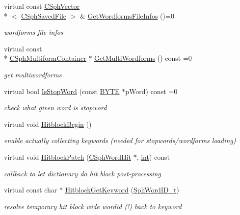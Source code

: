 \begin{DoxyCompactItemize}
virtual const \hyperlink{classCSphVector}{C\-Sph\-Vector}\\*
$<$ \hyperlink{structCSphSavedFile}{C\-Sph\-Saved\-File} $>$ \& \hyperlink{classCSphDict_accd7f795018b4f9f6b2b4c2e1115da13}{Get\-Wordforms\-File\-Infos} ()=0
\begin{DoxyCompactList}\small\item\em wordforms file infos \end{DoxyCompactList}\item 
virtual const \\*
\hyperlink{structCSphMultiformContainer}{C\-Sph\-Multiform\-Container} $\ast$ \hyperlink{classCSphDict_aa279b03d0a4b1a2ddc79c56887f48bcb}{Get\-Multi\-Wordforms} () const =0
\begin{DoxyCompactList}\small\item\em get multiwordforms \end{DoxyCompactList}\item 
virtual bool \hyperlink{classCSphDict_a5237fd1aa3eceb2fc3422d057af4986d}{Is\-Stop\-Word} (const \hyperlink{sphinxstd_8h_a4ae1dab0fb4b072a66584546209e7d58}{B\-Y\-T\-E} $\ast$p\-Word) const =0
\begin{DoxyCompactList}\small\item\em check what given word is stopword \end{DoxyCompactList}\item 
virtual void \hyperlink{classCSphDict_a51bb25ba9d3d4e38bb0136b894fce2c3}{Hitblock\-Begin} ()
\begin{DoxyCompactList}\small\item\em enable actually collecting keywords (needed for stopwords/wordforms loading) \end{DoxyCompactList}\item 
virtual void \hyperlink{classCSphDict_acc7efa292e426ed72b13eef361634c5f}{Hitblock\-Patch} (\hyperlink{structCSphWordHit}{C\-Sph\-Word\-Hit} $\ast$, \hyperlink{sphinxexpr_8cpp_a4a26e8f9cb8b736e0c4cbf4d16de985e}{int}) const 
\begin{DoxyCompactList}\small\item\em callback to let dictionary do hit block post-\/processing \end{DoxyCompactList}\item 
virtual const char $\ast$ \hyperlink{classCSphDict_ae89d2ea5d0d6882c25aa654f2ff3bc62}{Hitblock\-Get\-Keyword} (\hyperlink{sphinx_8h_a80a94d5984fdf9214a98f3e5e65df963}{Sph\-Word\-I\-D\-\_\-t})
\begin{DoxyCompactList}\small\item\em resolve temporary hit block wide wordid (!) back to keyword \end{DoxyCompactList}\item 

\end{DoxyCompactItemize}
